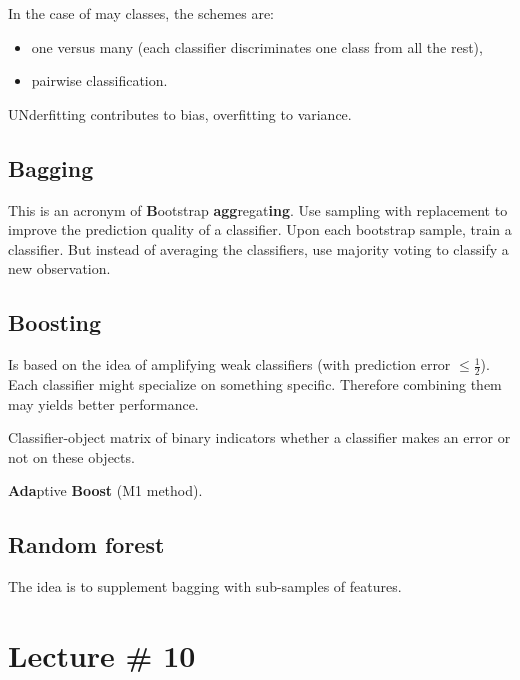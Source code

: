 \documentclass[a4paper]{article}
\begin{document}
In the case of may classes, the schemes are:
\begin{itemize}
	\item one versus many (each classifier discriminates one class from all the rest),
	\item pairwise classification.
\end{itemize}

UNderfitting contributes to bias, overfitting to variance.

\subsection{Bagging} %
\label{sub:bagging}

This is an acronym of \textbf{B}ootstrap \textbf{agg}regat\textbf{ing}.
Use sampling with replacement to improve the prediction quality of a classifier.
Upon each bootstrap sample, train a classifier. But instead of averaging the classifiers,
use majority voting to classify a new observation. 


\subsection{Boosting} %
\label{sub:boosting}

Is based on the idea of amplifying weak classifiers (with prediction error $\leq\frac{1}{2}$).
Each classifier might specialize on something specific. Therefore combining them may yields better performance.

Classifier-object matrix of binary indicators whether a classifier makes an error or not on these objects.

\textbf{Ada}ptive \textbf{Boost} (M1 method).


\subsection{Random forest} %
\label{sub:random_forest}

The idea is to supplement bagging with sub-samples of features.



\section{Lecture \# 10} %
\label{sec:lecture_#_10}
\end{document}
